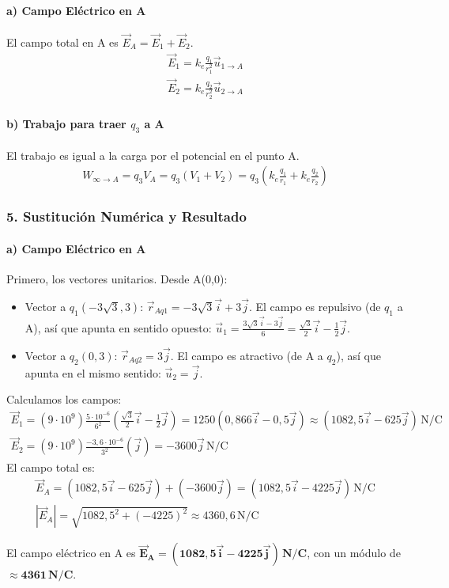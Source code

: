 \paragraph{a) Campo Eléctrico en A}
El campo total en A es $\vec{E}_A = \vec{E}_1 + \vec{E}_2$.
\begin{gather}
    \vec{E}_1 = k_e \frac{q_1}{r_1^2} \vec{u}_{1 \to A} \\
    \vec{E}_2 = k_e \frac{q_2}{r_2^2} \vec{u}_{2 \to A}
\end{gather}
\paragraph{b) Trabajo para traer $q_3$ a A}
El trabajo es igual a la carga por el potencial en el punto A.
\begin{gather}
    W_{\infty \to A} = q_3 V_A = q_3 (V_1 + V_2) = q_3 \left(k_e \frac{q_1}{r_1} + k_e \frac{q_2}{r_2}\right)
\end{gather}

\subsubsection*{5. Sustitución Numérica y Resultado}
\paragraph{a) Campo Eléctrico en A}
Primero, los vectores unitarios. Desde A(0,0):
\begin{itemize}
    \item Vector a $q_1(-3\sqrt{3},3)$: $\vec{r}_{Aq1} = -3\sqrt{3}\vec{i} + 3\vec{j}$. El campo es repulsivo (de $q_1$ a A), así que apunta en sentido opuesto: $\vec{u}_1 = \frac{3\sqrt{3}\vec{i} - 3\vec{j}}{6} = \frac{\sqrt{3}}{2}\vec{i} - \frac{1}{2}\vec{j}$.
    \item Vector a $q_2(0,3)$: $\vec{r}_{Aq2} = 3\vec{j}$. El campo es atractivo (de A a $q_2$), así que apunta en el mismo sentido: $\vec{u}_2 = \vec{j}$.
\end{itemize}
Calculamos los campos:
\begin{gather}
    \vec{E}_1 = (9\cdot 10^9) \frac{5 \cdot 10^{-6}}{6^2} \left(\frac{\sqrt{3}}{2}\vec{i} - \frac{1}{2}\vec{j}\right) = 1250(0,866\vec{i} - 0,5\vec{j}) \approx (1082,5\vec{i} - 625\vec{j})\, \text{N/C} \\
    \vec{E}_2 = (9\cdot 10^9) \frac{-3,6 \cdot 10^{-6}}{3^2} (\vec{j}) = -3600 \vec{j}\, \text{N/C}
\end{gather}
El campo total es:
\begin{gather}
    \vec{E}_A = (1082,5\vec{i} - 625\vec{j}) + (-3600\vec{j}) = (1082,5\vec{i} - 4225\vec{j})\, \text{N/C} \\
    |\vec{E}_A| = \sqrt{1082,5^2 + (-4225)^2} \approx 4360,6 \, \text{N/C}
\end{gather}
\begin{cajaresultado}
    El campo eléctrico en A es $\boldsymbol{\vec{E}_A = (1082,5\vec{i} - 4225\vec{j})\, \textbf{N/C}}$, con un módulo de $\boldsymbol{\approx 4361 \, \textbf{N/C}}$.
\end{cajaresultado}

